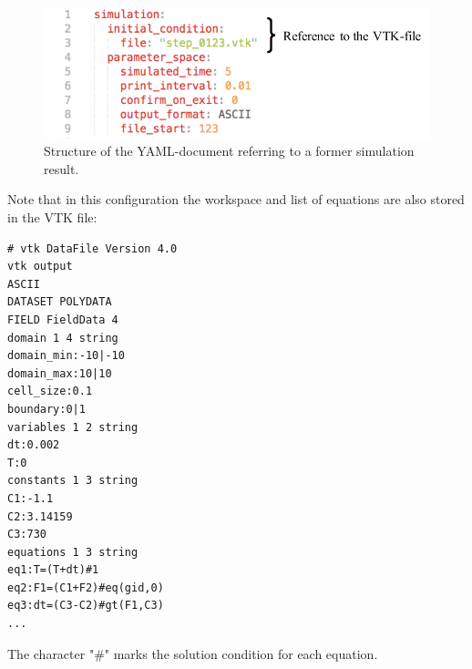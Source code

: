 \documentclass[a4paper,12pt,openany]{book}
\theoremstyle{break}
\begin{document}
\begin{figure}[H]
  \includegraphics[scale=1]{yaml_intro_simple.pdf}
  \centering
  \caption{Structure of the YAML-document referring to a former simulation result.}
  \label{fig:yaml_intro_simple}
\end{figure}\vspace*{3pt}
\newpage
Note that in this configuration the workspace and list of equations are also stored in the VTK file:\\
\begin{lstlisting}
# vtk DataFile Version 4.0
vtk output
ASCII
DATASET POLYDATA
FIELD FieldData 4
domain 1 4 string
domain_min:-10|-10
domain_max:10|10
cell_size:0.1
boundary:0|1
variables 1 2 string
dt:0.002
T:0
constants 1 3 string
C1:-1.1
C2:3.14159
C3:730
equations 1 3 string
eq1:T=(T+dt)#1
eq2:F1=(C1+F2)#eq(gid,0)
eq3:dt=(C3-C2)#gt(F1,C3)
...
\end{lstlisting}
The character "\#" marks the solution condition for each equation.
\end{document}
